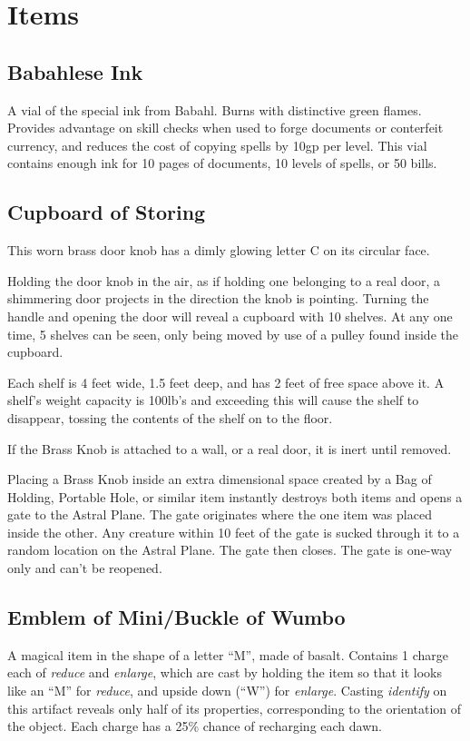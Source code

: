 \section{Items}
\subsection{Babahlese Ink}
\label{items:ink}
A vial of the special ink from Babahl. Burns with distinctive green flames. Provides advantage on skill checks when used to forge documents or conterfeit currency, and reduces the cost of copying spells by 10gp per level. This vial contains enough ink for 10 pages of documents, 10 levels of spells, or 50 bills.

\subsection{Cupboard of Storing}
\label{items:cupboard}
This worn brass door knob has a dimly glowing letter C on its circular face.


Holding the door knob in the air, as if holding one belonging to a real door, a shimmering door projects in the direction the knob is pointing. Turning the handle and opening the door will reveal a cupboard with 10 shelves. At any one time, 5 shelves can be seen, only being moved by use of a pulley found inside the cupboard.


Each shelf is 4 feet wide, 1.5 feet deep, and has 2 feet of free space above it. A shelf's weight capacity is 100lb's and exceeding this will cause the shelf to disappear, tossing the contents of the shelf on to the floor.


If the Brass Knob is attached to a wall, or a real door, it is inert until removed.


Placing a Brass Knob inside an extra dimensional space created by a Bag of Holding, Portable Hole, or similar item instantly destroys both items and opens a gate to the Astral Plane. The gate originates where the one item was placed inside the other. Any creature within 10 feet of the gate is sucked through it to a random location on the Astral Plane. The gate then closes. The gate is one-way only and can't be reopened.

\subsection{Emblem of Mini/Buckle of Wumbo}
\label{items:wumbo}
A magical item in the shape of a letter ``M'', made of basalt. Contains 1 charge each of \textit{reduce} and \textit{enlarge}, which are cast by holding the item so that it looks like an ``M'' for \textit{reduce}, and upside down (``W'') for \textit{enlarge}. Casting \textit{identify} on this artifact reveals only half of its properties, corresponding to the orientation of the object. Each charge has a 25\% chance of recharging each dawn.

